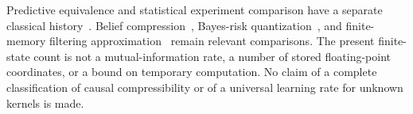 Predictive equivalence and statistical experiment comparison have a separate classical history~\cite{SC,Fritz}. Belief compression~\cite{PB}, Bayes-risk quantization~\cite{Varshney}, and finite-memory filtering approximation~\cite{Kim} remain relevant comparisons. The present finite-state count is not a mutual-information rate, a number of stored floating-point coordinates, or a bound on temporary computation. No claim of a complete classification of causal compressibility or of a universal learning rate for unknown kernels is made.
